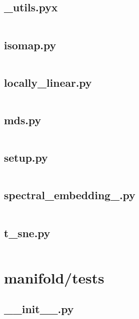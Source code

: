 \documentclass{article}
\begin{document}
\subsection{\_utils.pyx}
\inputminted{cython}{/home/dufferzafar/dev/@clones/scikit-learn/sklearn/manifold/_utils.pyx}
\newpage

\subsection{isomap.py}
\inputminted{python}{/home/dufferzafar/dev/@clones/scikit-learn/sklearn/manifold/isomap.py}
\newpage

\subsection{locally\_linear.py}
\inputminted{python}{/home/dufferzafar/dev/@clones/scikit-learn/sklearn/manifold/locally_linear.py}
\newpage

\subsection{mds.py}
\inputminted{python}{/home/dufferzafar/dev/@clones/scikit-learn/sklearn/manifold/mds.py}
\newpage

\subsection{setup.py}
\inputminted{python}{/home/dufferzafar/dev/@clones/scikit-learn/sklearn/manifold/setup.py}
\newpage

\subsection{spectral\_embedding\_.py}
\inputminted{python}{/home/dufferzafar/dev/@clones/scikit-learn/sklearn/manifold/spectral_embedding_.py}
\newpage

\subsection{t\_sne.py}
\inputminted{python}{/home/dufferzafar/dev/@clones/scikit-learn/sklearn/manifold/t_sne.py}
\newpage

\section{manifold/tests}

\subsection{\_\_init\_\_.py}
\inputminted{python}{/home/dufferzafar/dev/@clones/scikit-learn/sklearn/manifold/tests/__init__.py}
\newpage
\end{document}
